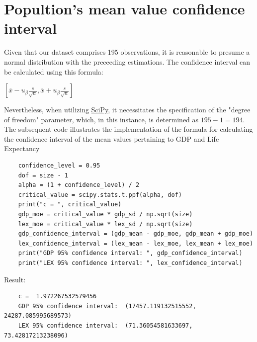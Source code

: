 \section{Popultion's mean value confidence interval}
Given that our dataset comprises 195 observations, it is reasonable to presume a normal distribution with the preceeding estimations. 
The confidence interval can be calculated using this formula:
\begin{center}
    {\fontsize{16}{20}\selectfont $[\overline{x} - u_\beta \frac{s}{\sqrt{n}}, \overline{x} + u_\beta \frac{s}{\sqrt{n}}]$}
\end{center}
Nevertheless, when utilizing \href{https://scipy.org/}{SciPy}, it necessitates the specification of the "degree of freedom" parameter, which, in this instance, is determined as $195 - 1 = 194$.
The subsequent code illustrates the implementation of the formula for calculating the confidence interval of the mean values pertaining to GDP and Life Expectancy
\begin{verbatim}
    confidence_level = 0.95
    dof = size - 1
    alpha = (1 + confidence_level) / 2
    critical_value = scipy.stats.t.ppf(alpha, dof)
    print("c = ", critical_value)
    gdp_moe = critical_value * gdp_sd / np.sqrt(size)
    lex_moe = critical_value * lex_sd / np.sqrt(size)
    gdp_confidence_interval = (gdp_mean - gdp_moe, gdp_mean + gdp_moe)
    lex_confidence_interval = (lex_mean - lex_moe, lex_mean + lex_moe)
    print("GDP 95% confidence interval: ", gdp_confidence_interval)
    print("LEX 95% confidence interval: ", lex_confidence_interval)
\end{verbatim}
\newpage
Result:
\begin{verbatim}
    c =  1.972267532579456
    GDP 95% confidence interval:  (17457.119132515552, 24287.085995689573)
    LEX 95% confidence interval:  (71.36054581633697, 73.42817213238096)
\end{verbatim}